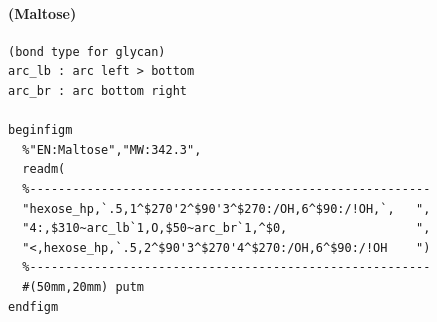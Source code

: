 \documentclass[a4paper]{article}
\begin{document}
\paragraph{(Maltose)}
\begin{verbatim}
(bond type for glycan)
arc_lb : arc left > bottom
arc_br : arc bottom right

beginfigm
  %"EN:Maltose","MW:342.3",
  readm(
  %--------------------------------------------------------
  "hexose_hp,`.5,1^$270'2^$90'3^$270:/OH,6^$90:/!OH,`,   ",
  "4:,$310~arc_lb`1,O,$50~arc_br`1,^$0,                  ",
  "<,hexose_hp,`.5,2^$90'3^$270'4^$270:/OH,6^$90:/!OH    ")
  %--------------------------------------------------------
  #(50mm,20mm) putm
endfigm
\end{verbatim}
\newpage
\end{document}
